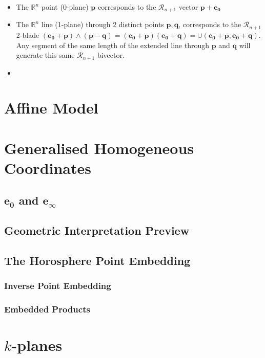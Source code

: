 \documentclass[a4paper]{book}
\numberwithin{equation}{chapter}
\begin{document}
\begin{itemize}
    \item The $\mathbb{R}^n$ point (0-plane) $\mathbf{p}$ corresponds to the
    $\mathcal{R}_{n+1}$ vector $\mathbf{p+e_0}$

    \item The $\mathbb{R}^n$ line (1-plane) through 2 distinct points $\mathbf{p,q}$, corresponds
    to the $\mathcal{R}_{n+1}$ 2-blade $\mathbf{(e_0 + p )\wedge (p-q)=(e_0+p)(e_0 + q)=
    \cup(e_0+p, e_0 + q)}$. Any segment of the same length of the extended line through $\mathbf{p}$ and
    $\mathbf{q}$ will generate this same $\mathcal{R}_{n+1}$ bivector.

    \item 
\end{itemize}
    
    \section{Affine Model}
    \section{Generalised Homogeneous Coordinates}

    \subsection{$\mathbf{e_0}$ and $\mathbf{e_\infty}$}

    \subsection{Geometric Interpretation Preview}

    \subsection{The Horosphere Point Embedding}

    \subsubsection{Inverse Point Embedding}
    \subsubsection{Embedded Products}
    
    \section{$k$-planes}
\end{document}
